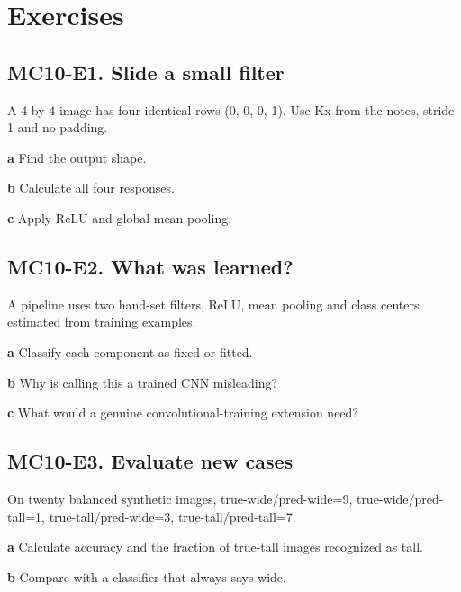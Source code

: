 \documentclass[11pt,letterpaper]{article}
\theoremstyle{definition}\newtheorem{definition}{Definition}\newtheorem{example}{Example}
\numberwithin{equation}{section}
\begin{document}
\section*{Exercises}
\par\noindent\begin{minipage}{\linewidth}
\subsection*{MC10-E1. Slide a small filter}
A 4 by 4 image has four identical rows (0, 0, 0, 1). Use Kx from the notes, stride 1 and no padding.

\textbf{a} Find the output shape.

\end{minipage}\par\medskip
\textbf{b} Calculate all four responses.

\textbf{c} Apply ReLU and global mean pooling.

\par\noindent\begin{minipage}{\linewidth}
\subsection*{MC10-E2. What was learned?}
A pipeline uses two hand-set filters, ReLU, mean pooling and class centers estimated from training examples.

\textbf{a} Classify each component as fixed or fitted.

\end{minipage}\par\medskip
\textbf{b} Why is calling this a trained CNN misleading?

\textbf{c} What would a genuine convolutional-training extension need?

\par\noindent\begin{minipage}{\linewidth}
\subsection*{MC10-E3. Evaluate new cases}
On twenty balanced synthetic images, true-wide/pred-wide=\allowbreak{}9, true-wide/pred-tall=\allowbreak{}1, true-tall/pred-wide=\allowbreak{}3, true-tall/pred-tall=\allowbreak{}7.

\textbf{a} Calculate accuracy and the fraction of true-tall images recognized as tall.

\end{minipage}\par\medskip
\textbf{b} Compare with a classifier that always says wide.
\end{document}
